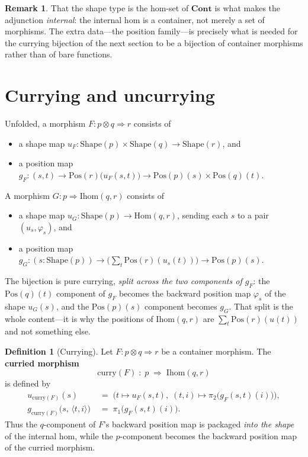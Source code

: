 \documentclass[11pt,a4paper]{article}
\theoremstyle{plain}
\theoremstyle{definition}
\newtheorem{definition}[theorem]{Definition}
\newtheorem{remark}[theorem]{Remark}
\newcommand{\Shape}{\mathrm{Shape}}
\newcommand{\Pos}{\mathrm{Pos}}
\newcommand{\Ihom}{\mathrm{Ihom}}
\newcommand{\Cont}{\mathbf{Cont}}
\newcommand{\Hom}{\mathrm{Hom}}
\begin{document}
\begin{remark}
That the shape type is the hom-set of $\Cont$ is what makes the adjunction
\emph{internal}: the internal hom is a container, not merely a set of
morphisms. The extra data---the position family---is precisely what is
needed for the currying bijection of the next section to be a bijection of
container morphisms rather than of bare functions.
\end{remark}

\section{Currying and uncurrying}

Unfolded, a morphism $F : p \otimes q \Rightarrow r$ consists of
\begin{itemize}
  \item a shape map $u_F : \Shape(p) \times \Shape(q) \to \Shape(r)$, and
  \item a position map
        $g_F : (s,t) \to \Pos(r)\bigl(u_F(s,t)\bigr)
        \to \Pos(p)(s) \times \Pos(q)(t)$.
\end{itemize}
A morphism $G : p \Rightarrow \Ihom(q,r)$ consists of
\begin{itemize}
  \item a shape map $u_G : \Shape(p) \to \Hom(q,r)$, sending each $s$ to a
        pair $(u_s, \varphi_s)$, and
  \item a position map
        $g_G : (s : \Shape(p)) \to
        \bigl(\sum_t \Pos(r)(u_s(t))\bigr) \to \Pos(p)(s)$.
\end{itemize}
The bijection is pure currying, \emph{split across the two components of
$g_F$}: the $\Pos(q)(t)$ component of $g_F$ becomes the backward position
map $\varphi_s$ of the shape $u_G(s)$, and the $\Pos(p)(s)$ component
becomes $g_G$. That split is the whole content---it is why the positions
of $\Ihom(q,r)$ are $\sum_t \Pos(r)(u(t))$ and not something else.

\begin{definition}[Currying]\label{def:curry}
Let $F : p \otimes q \Rightarrow r$ be a container morphism. The
\textbf{curried morphism}
\begin{equation}
  \mathrm{curry}(F) \;:\; p \;\Rightarrow\; \Ihom(q,r)
\end{equation}
is defined by
\begin{align}
  u_{\mathrm{curry}(F)}(s)
  &\;=\;
  \bigl(
    t \mapsto u_F(s,t),\;
    (t,i) \mapsto \pi_2\bigl(g_F(s,t)(i)\bigr)
  \bigr), \\[4pt]
  g_{\mathrm{curry}(F)}\bigl(s,\, \langle t, i \rangle\bigr)
  &\;=\;
  \pi_1\bigl(g_F(s,t)(i)\bigr).
\end{align}
Thus the $q$-component of $F$'s backward position map is packaged
\emph{into the shape} of the internal hom, while the $p$-component becomes
the backward position map of the curried morphism.
\end{definition}
\end{document}

